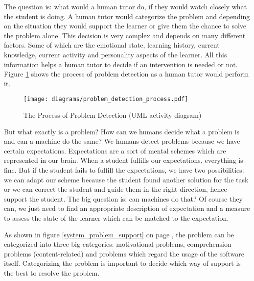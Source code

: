 The question is: what would a human tutor do, if they would watch closely
what the student is doing. A human tutor would categorize the problem and
depending on the situation they would support the learner or give them the chance
to solve the problem alone. This decision is very complex and depends on many
different factors. Some of which are the emotional state, learning history,
current knowledge, current activity and personality aspects of the learner. All this information
helps a human tutor to decide if an intervention is needed or not. Figure
\ref{problem_detection_process} shows the process of problem detection as a
human tutor would perform it.

\begin{figure}
    \centering
    \texttt{[image: diagrams/problem\_detection\_process.pdf]}
    \caption[The Process of Problem Detection (UML activity diagram)]
    {The Process of Problem Detection (UML activity diagram)}
    \label{problem_detection_process}
\end{figure}



But what exactly is a problem? How can we humans decide what a problem is
and can a machine do the same? We humans detect problems because we have
certain expectations. Expectations are a sort of mental schemes which are
represented in our brain. When a student fulfills our expectations,
everything is fine. But if the student fails to fulfill the expectations, we
have two possibilities: we can adapt our scheme because the student found
another solution for the task or we can correct the student and guide them in
the right direction, hence support the student. The big question is: can
machines do that? Of course they can, we just need to find an appropriate
description of expectation and a measure to assess the state of the learner
which can be matched to the expectation.

As shown in figure \ref{system_problem_support} on page
\pageref{system_problem_support}, the problem can be
categorized into three big categories: motivational problems, comprehension
problems (content-related) and problems which regard the usage of the software
itself. Categorizing the problem is important to decide which way of support
is the best to resolve the problem.

